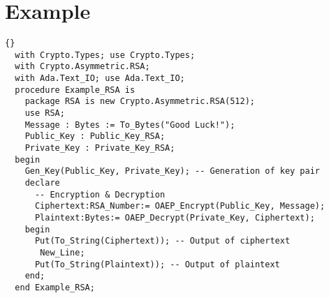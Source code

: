 \section{Example}
\begin{lstlisting}{}
  with Crypto.Types; use Crypto.Types;
  with Crypto.Asymmetric.RSA;
  with Ada.Text_IO; use Ada.Text_IO;
  procedure Example_RSA is
    package RSA is new Crypto.Asymmetric.RSA(512);
    use RSA;
    Message : Bytes := To_Bytes("Good Luck!");
    Public_Key : Public_Key_RSA;
    Private_Key : Private_Key_RSA;
  begin
    Gen_Key(Public_Key, Private_Key); -- Generation of key pair
    declare 
      -- Encryption & Decryption
	  Ciphertext:RSA_Number:= OAEP_Encrypt(Public_Key, Message);
	  Plaintext:Bytes:= OAEP_Decrypt(Private_Key, Ciphertext);
    begin
      Put(To_String(Ciphertext)); -- Output of ciphertext
	   New_Line;
      Put(To_String(Plaintext)); -- Output of plaintext
    end;
  end Example_RSA;
\end{lstlisting}